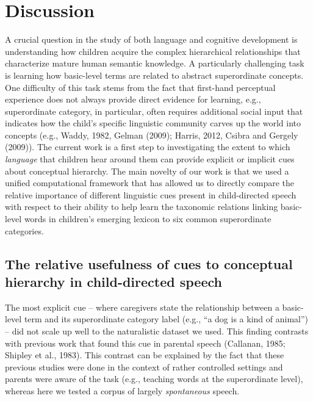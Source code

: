 \documentclass[english,,man]{apa6}
\begin{document}
\hypertarget{discussion}{%
\section{Discussion}\label{discussion}}

A crucial question in the study of both language and cognitive development is understanding how children acquire the complex hierarchical relationships that characterize mature human semantic knowledge. A particularly challenging task is learning how basic-level terms are related to abstract superordinate concepts. One difficulty of this task stems from the fact that first-hand perceptual experience does not always provide direct evidence for learning, e.g., superordinate category, in particular, often requires additional social input that indicates how the child's specific linguistic community carves up the world into concepts (e.g., Waddy, 1982, Gelman (2009); Harris, 2012, Csibra and Gergely (2009)). The current work is a first step to investigating the extent to which \emph{language} that children hear around them can provide explicit or implicit cues about conceptual hierarchy. The main novelty of our work is that we used a unified computational framework that has allowed us to directly compare the relative importance of different linguistic cues present in child-directed speech with respect to their ability to help learn the taxonomic relations linking basic-level words in children's emerging lexicon to six common superordinate categories.

\hypertarget{the-relative-usefulness-of-cues-to-conceptual-hierarchy-in-child-directed-speech}{%
\subsection{The relative usefulness of cues to conceptual hierarchy in child-directed speech}\label{the-relative-usefulness-of-cues-to-conceptual-hierarchy-in-child-directed-speech}}

The most explicit cue -- where caregivers state the relationship between a basic-level term and its superordinate category label (e.g., \enquote{a dog is a kind of animal}) -- did not scale up well to the naturalistic dataset we used. This finding contrasts with previous work that found this cue in parental speech (Callanan, 1985; Shipley et al., 1983). This contrast can be explained by the fact that these previous studies were done in the context of rather controlled settings and parents were aware of the task (e.g., teaching words at the superordinate level), whereas here we tested a corpus of largely \emph{spontaneous} speech.
\end{document}
